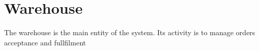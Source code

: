\section{Warehouse}

The warehouse is the main entity of the system. Its activity is to manage orders acceptance and fullfilment
